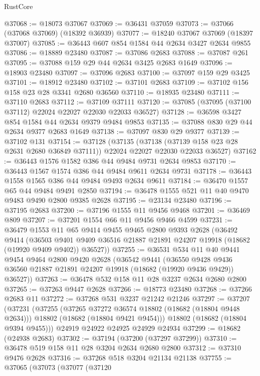 \begin{lexlean}{RustCore}
\begin{coremodule}
@37068 := @18073 @37067
@37069 := @36431 @37059
@37073 := @37066 (@37068 @37069) (@18392 @36939)
@37077 := @18240 @37067 @37069 (@18397 @37007)
@37085 := @36443 @607 @854 @1584 @44 @2634 @3427 @2634 @9855
@37086 := @18889 @23480
@37087 := @37086 @2683
@37088 := @37087 @261
@37095 := @37088 @159 @29 @44 @2634 @3425 @2683 @1649
@37096 := @18903 @23480
@37097 := @37096 @2683
@37100 := @37097 @159 @29 @3425
@37101 := @18912 @23480
@37102 := @37101 @2683
@37109 := @37102 @156 @158 @23 @28 @3341 @2680 @36560
@37110 := @18935 @23480
@37111 := @37110 @2683
@37112 := @37109 @37111
@37120 := @37085 (@37095 (@37100 @37112) @22024 @22027 @22030 @22033 @36527)
@37128 := @36598 @3427 @854 @1584 @44 @2634 @9379 @9484 @9853
@37135 := @37088 @830 @29 @44 @2634 @9377 @2683 @1649
@37138 := @37097 @830 @29 @9377
@37139 := @37102 @131
@37154 := @37128
    (@37135
      (@37138 (@37139 @158 @23 @28 @2631 @2680 @36849 @37111))
      @22024
      @22027
      @22030
      @22033
      @36527)
@37162 := @36443 @1576 @1582 @386 @44 @9484 @9731 @2634 @9853
@37170 := @36443 @1567 @1574 @386 @44 @9484 @9611 @2634 @9731
@37178 := @36443 @1558 @1565 @386 @44 @9484 @9493 @2634 @9611
@37184 := @36470 @1557 @65 @44 @9484 @9491 @2850
@37194 := @36478 @1555 @521 @11 @40 @9470 @9483 @9490 @2800 @9385 @2628
@37195 := @23134 @23480
@37196 := @37195 @2683
@37200 := @37196 @1555 @11 @9456 @9468
@37201 := @36469 @809
@37207 := @37201 @1554 @66 @11 @9456 @9466 @4599
@37231 := @36479
    @1553
    @11
    @65
    @9414
    @9455
    @9465
    @2800
    @9393
    @2628
    (@36492
      @9414
      (@36503 @9401 @9409 @36516 @21887 @21891 @24207 @19918 (@18682 (@19920 @9409 @9402)) @36527))
@37255 := @36531
    @534
    @11
    @40
    @9441
    @9454
    @9464
    @2800
    @9420
    @2628
    (@36542
      @9441
      (@36550 @9428 @9436 @36560 @21887 @21891 @24207 @19918 (@18682 (@19920 @9436 @9429)) @36527))
@37263 := @36478 @532 @158 @11 @28 @3237 @2634 @2680 @2800
@37265 := @37263 @9447 @2628
@37266 := @18773 @23480
@37268 := @37266 @2683 @11
@37272 := @37268 @531 @3237 @21242 @21246
@37297 := @37207
    (@37231
      (@37255
        (@37265 @37272 @36574 @18802 (@18682 (@18804 @9448 @2634)))
        @18802
        (@18682 (@18804 @9421 @9454)))
      @18802
      (@18682 (@18804 @9394 @9455)))
    @24919
    @24922
    @24925
    @24929
    @24934
@37299 := @18682 (@24938 @2683)
@37302 := @37194 (@37200 (@37297 @37299))
@37310 := @36478 @519 @158 @11 @28 @3204 @2634 @2680 @2800
@37312 := @37310 @9476 @2628
@37316 := @37268 @518 @3204 @21134 @21138
@37755 := @37065
    (@37073
      (@37077
        (@37120

\end{coremodule}
\end{lexlean}
